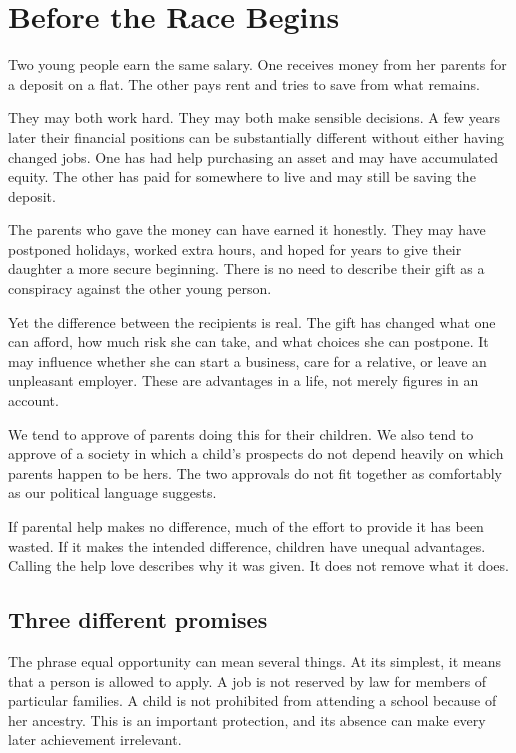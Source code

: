 \documentclass[12pt,a4paper]{book}
\begin{document}
\chapter{Before the Race Begins}

Two young people earn the same salary. One receives money from her parents for a deposit on a flat. The other pays rent and tries to save from what remains.

They may both work hard. They may both make sensible decisions. A few years later their financial positions can be substantially different without either having changed jobs. One has had help purchasing an asset and may have accumulated equity. The other has paid for somewhere to live and may still be saving the deposit.

The parents who gave the money can have earned it honestly. They may have postponed holidays, worked extra hours, and hoped for years to give their daughter a more secure beginning. There is no need to describe their gift as a conspiracy against the other young person.

Yet the difference between the recipients is real. The gift has changed what one can afford, how much risk she can take, and what choices she can postpone. It may influence whether she can start a business, care for a relative, or leave an unpleasant employer. These are advantages in a life, not merely figures in an account.

We tend to approve of parents doing this for their children. We also tend to approve of a society in which a child's prospects do not depend heavily on which parents happen to be hers. The two approvals do not fit together as comfortably as our political language suggests.

If parental help makes no difference, much of the effort to provide it has been wasted. If it makes the intended difference, children have unequal advantages. Calling the help love describes why it was given. It does not remove what it does.

\section*{Three different promises}

The phrase equal opportunity can mean several things. At its simplest, it means that a person is allowed to apply. A job is not reserved by law for members of particular families. A child is not prohibited from attending a school because of her ancestry. This is an important protection, and its absence can make every later achievement irrelevant.
\end{document}
